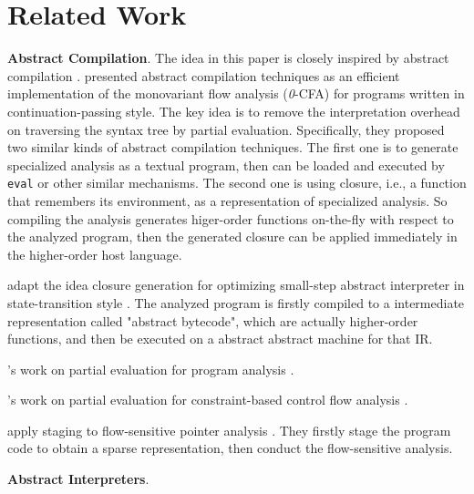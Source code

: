 \section{Related Work}

\textbf{Abstract Compilation}. The idea in this paper is closely inspired by 
abstract compilation \cite{Boucher:1996:ACN:647473.727587}.
\citeauthor{Boucher:1996:ACN:647473.727587} presented abstract compilation
techniques as an efficient implementation of the monovariant flow analysis 
(\textit{0}-CFA) for programs written in continuation-passing style. 
The key idea is to remove the interpretation overhead on traversing the syntax 
tree by partial evaluation. Specifically, they proposed two similar kinds of abstract compilation techniques.
The first one is to generate specialized analysis as a textual program, then 
can be loaded and executed by \texttt{eval} or other similar mechanisms. 
The second one is using closure, i.e., a function that remembers its environment, 
as a representation of specialized analysis. 
So compiling the analysis generates higer-order functions on-the-fly with respect to the analyzed program,
then the generated closure can be applied immediately in the higher-order host language.

\citeauthor{Johnson:2013:OAA:2500365.2500604} adapt the idea closure generation 
for optimizing small-step abstract interpreter in state-transition style \cite{Johnson:2013:OAA:2500365.2500604}.
The analyzed program is firstly compiled to a intermediate representation called 
"abstract bytecode", which are actually higher-order functions, and then be executed 
on a abstract abstract machine for that IR.


\citeauthor{damian1999partial}'s work on partial evaluation for program analysis \cite{damian1999partial}.

\citeauthor{amtoft1999partial}'s work on partial evaluation for constraint-based 
control flow analysis \cite{amtoft1999partial}.

\citeauthor{DBLP:conf/cgo/HardekopfL11} apply staging to flow-sensitive pointer analysis \cite{DBLP:conf/cgo/HardekopfL11}. 
They firstly stage the program code to obtain a sparse representation, then conduct
the flow-sensitive analysis. 

\textbf{Abstract Interpreters}. 

